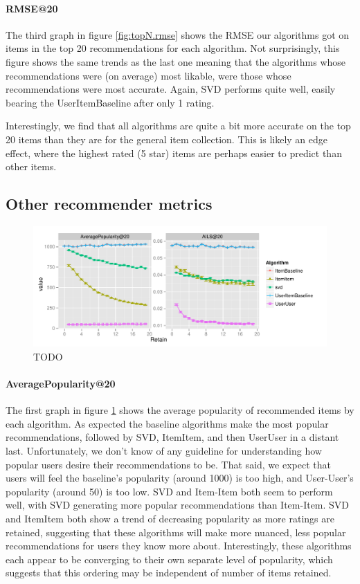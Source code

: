 \documentclass[letterpaper]{sig-alternate}
\begin{document}
  \paragraph{RMSE@20}
  The third graph in figure \ref{fig:topN.rmse} shows the RMSE our algorithms got on items in the top 20 recommendations for each algorithm.
  Not surprisingly, this figure shows the same trends as the last one meaning that the algorithms whose recommendations were (on average) most likable, were those whose recommendations were most accurate.
  Again, SVD performs quite well, easily bearing the UserItemBaseline after only 1 rating.
  
  Interestingly, we find that all algorithms are quite a bit more accurate on the top 20 items than they are for the general item collection.
  This is likely an edge effect, where the highest rated (5 star) items are perhaps easier to predict than other items.

\subsection{Other recommender metrics}

\begin{figure}[ht!]
  \centering
  \includegraphics[width=\linewidth]{../lenskit/output/ekstrandTuned20/popdiv.pdf}
  \caption{TODO}
  \label{fig:pop}
\end{figure}

  \paragraph{AveragePopularity@20}
  The first graph in figure \ref{fig:pop} shows the average popularity of recommended items by each algorithm.
  As expected the baseline algorithms make the most popular recommendations, followed by SVD, ItemItem, and then UserUser in a distant last.
  Unfortunately, we don't know of any guideline for understanding how popular users desire their recommendations to be.
  That said, we expect that users will feel the baseline's popularity (around 1000) is too high, and User-User's popularity (around 50) is too low.
  SVD and Item-Item both seem to perform well, with SVD generating more popular recommendations than Item-Item.
  SVD and ItemItem both show a trend of decreasing popularity as more ratings are retained, suggesting that these algorithms will make more nuanced, less popular recommendations for users they know more about.
  Interestingly, these algorithms each appear to be converging to their own separate level of popularity, which suggests that this ordering may be independent of number of items retained.
\end{document}
